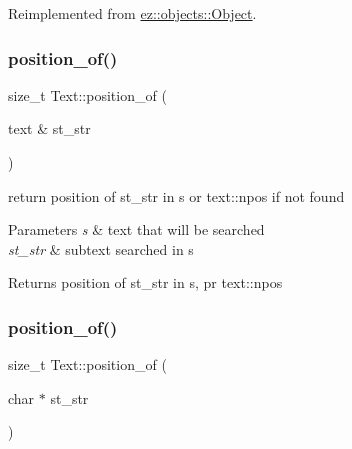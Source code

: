Reimplemented from \hyperlink{classez_1_1objects_1_1Object_a0fdfe18e6c35d6b0d7e7a01265aded15}{ez\+::objects\+::\+Object}.

\mbox{\label{classez_1_1objects_1_1Text_a3284d557f746aae28ac3a40c419d08b9}} 
\subsubsection{\texorpdfstring{position\+\_\+of()}{position\_of()}\hspace{0.1cm}{\footnotesize\ttfamily [1/2]}}
{\footnotesize\ttfamily size\+\_\+t Text\+::position\+\_\+of (\begin{DoxyParamCaption}\item[{text \&}]{st\+\_\+str }\end{DoxyParamCaption})}

return position of st\+\_\+str in s or text\+::npos if not found 
\begin{DoxyParams}{Parameters}
{\em s} & text that will be searched \\
\hline
{\em st\+\_\+str} & subtext searched in s \\
\hline
\end{DoxyParams}
\begin{DoxyReturn}{Returns}
position of st\+\_\+str in s, pr text\+::npos 
\end{DoxyReturn}
\mbox{\label{classez_1_1objects_1_1Text_a23753760d867a42e2ddcf86a2845ff81}} 
\subsubsection{\texorpdfstring{position\+\_\+of()}{position\_of()}\hspace{0.1cm}{\footnotesize\ttfamily [2/2]}}
{\footnotesize\ttfamily size\+\_\+t Text\+::position\+\_\+of (\begin{DoxyParamCaption}\item[{char $\ast$}]{st\+\_\+str }\end{DoxyParamCaption})}


